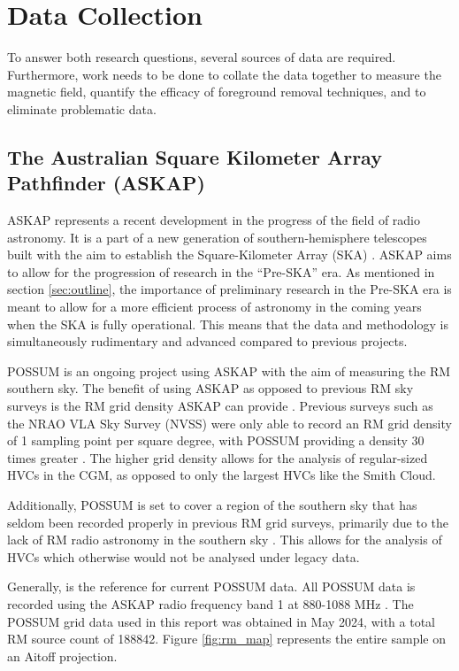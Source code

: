 \chapter{Data Collection}
\label{cha:data}

To answer both research questions, several sources of data are required. Furthermore, work needs to be done to collate the data together to measure the magnetic field, quantify the efficacy of foreground removal techniques, and to eliminate problematic data.

\section{The Australian Square Kilometer Array Pathfinder (ASKAP)}
\label{sec:ASKAP}

ASKAP represents a recent development in the progress of the field of radio astronomy. It is a part of a new generation of southern-hemisphere telescopes built with the aim to establish the Square-Kilometer Array (SKA) \citep{ID61, ID52}. ASKAP aims to allow for the progression of research in the “Pre-SKA” era. As mentioned in section \ref{sec:outline}, the importance of preliminary research in the Pre-SKA era is meant to allow for a more efficient process of astronomy in the coming years when the SKA is fully operational. This means that the data and methodology is simultaneously rudimentary and advanced compared to previous projects.


POSSUM is an ongoing project using ASKAP with the aim of measuring the RM southern sky. The benefit of using ASKAP as opposed to previous RM sky surveys is the RM grid density ASKAP can provide \citep{ID52, ID61}. Previous surveys such as the NRAO VLA Sky Survey (NVSS) were only able to record an RM grid density of 1 sampling point per square degree, with POSSUM providing a density 30 times greater \citep{ID1, ID52, ID61, ID18}. The higher grid density allows for the analysis of regular-sized HVCs in the CGM, as opposed to only the largest HVCs like the Smith Cloud.


Additionally, POSSUM is set to cover a region of the southern sky that has seldom been recorded properly in previous RM grid surveys, primarily due to the lack of RM radio astronomy in the southern sky \citep{ID44, ID45, ID52}. This allows for the analysis of HVCs which otherwise would not be analysed under legacy data.


Generally, \cite{ID52} is the reference for current POSSUM data. All POSSUM data is recorded using the ASKAP radio frequency band 1 at 880-1088 MHz \citep{ID1, ID52}. The POSSUM grid data used in this report was obtained in May 2024, with a total RM source count of 188842. Figure \ref{fig:rm_map} represents the entire sample on an Aitoff projection.

